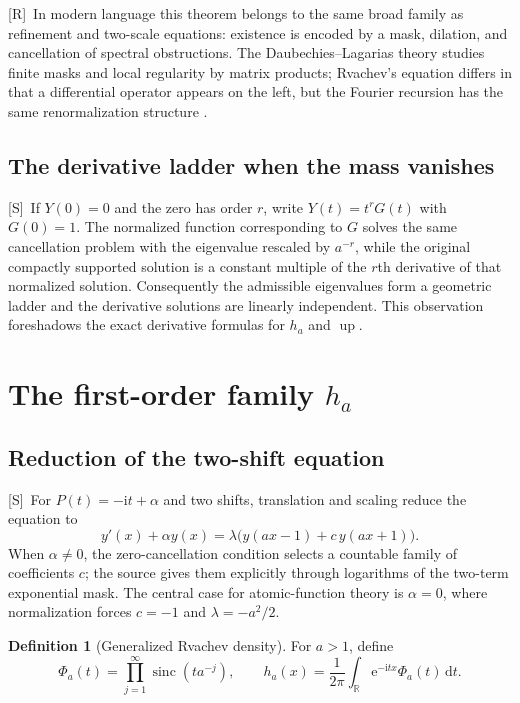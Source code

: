 \documentclass[11pt,oneside]{article}
\theoremstyle{definition}
\newtheorem{definition}[theorem]{Definition}
\theoremstyle{remark}
\newcommand{\R}{\mathbb R}
\newcommand{\Up}{\operatorname{up}}
\newcommand{\sinc}{\operatorname{sinc}}
\newcommand{\e}{\mathrm e}
\newcommand{\ii}{\mathrm i}
\newcommand{\dd}{\,\mathrm d}
\newcommand{\Smark}{\textcolor{sourceblue}{\textsf{[S]}}}
\newcommand{\Rmark}{\textcolor{sourceblue}{\textsf{[R]}}}
\begin{document}
\Rmark\ In modern language this theorem belongs to the same broad family as refinement and
two-scale equations: existence is encoded by a mask, dilation, and cancellation of spectral
obstructions.  The Daubechies--Lagarias theory studies finite masks and local regularity by
matrix products; Rvachev's equation differs in that a differential operator appears on the
left, but the Fourier recursion has the same renormalization structure
\cite{daubechieslagarias1,daubechieslagarias2}.

\subsection{The derivative ladder when the mass vanishes}

\Smark\ If $Y(0)=0$ and the zero has order $r$, write $Y(t)=t^rG(t)$ with $G(0)=1$.
The normalized function corresponding to $G$ solves the same cancellation problem with the
eigenvalue rescaled by $a^{-r}$, while the original compactly supported solution is a constant
multiple of the $r$th derivative of that normalized solution.  Consequently the admissible
eigenvalues form a geometric ladder and the derivative solutions are linearly independent.
This observation foreshadows the exact derivative formulas for $h_a$ and $\Up$.

\section{The first-order family $h_a$}
\label{sec:ha-definition}

\subsection{Reduction of the two-shift equation}

\Smark\ For $P(t)=-\ii t+\alpha$ and two shifts, translation and scaling reduce the equation
to
\begin{equation}
 y'(x)+\alpha y(x)=\lambda\bigl(y(ax-1)+c\,y(ax+1)\bigr).
 \tag{S3.22}
 \label{eq:first-order-normal}
\end{equation}
When $\alpha\ne0$, the zero-cancellation condition selects a countable family of coefficients
$c$; the source gives them explicitly through logarithms of the two-term exponential mask.
The central case for atomic-function theory is $\alpha=0$, where normalization forces
$c=-1$ and $\lambda=-a^2/2$.

\begin{definition}[Generalized Rvachev density]
\label{def:ha}
For $a>1$, define
\begin{equation}
 \Phi_a(t)=\prod_{j=1}^{\infty}\sinc(ta^{-j}),
 \qquad
 h_a(x)=\frac1{2\pi}\int_{\R}\e^{-\ii tx}\Phi_a(t)\dd t.
 \tag{S3.24--S3.25}
 \label{eq:ha-Fourier}
\end{equation}
\end{definition}
\end{document}
